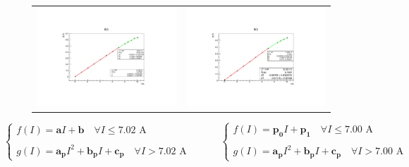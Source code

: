 \documentclass[a4paper,12pt,abstracton]{scrartcl}
\begin{document}
\begin{figure}[H]\hspace{-0.8cm}
    \begin{tabular}{c c}
      \includegraphics[scale=0.46]{plots/BIcre1.pdf}  &\hspace{0.1cm} \includegraphics[scale=0.46]{plots/BIdec1.pdf} \\
      \end{tabular}
    \caption{}
    \label{fig:BI1}
\end{figure}
$$
\begin{cases}
f(I)=\boldsymbol{a} I + \boldsymbol{b} \quad \forall I \leq 7.02  \text{ A} \\ \\
g(I)= \boldsymbol{a_p}I^2 + \boldsymbol{b_p}I + \boldsymbol{c_p} \quad \forall I > 7.02  \text{ A}
\end{cases}
\qquad\quad
\begin{cases}
f(I)=\boldsymbol{p_0} I + \boldsymbol{p_1} \quad \forall I \leq 7.00 \text{ A} \\ \\
g(I)= \boldsymbol{a_p}I^2 + \boldsymbol{b_p}I + \boldsymbol{c_p} \quad \forall I > 7.00 \text{ A}
\end{cases}
$$
\end{document}
